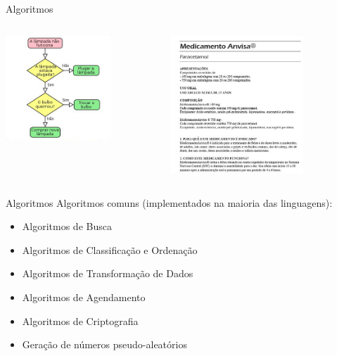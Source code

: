 \documentclass{beamer}
\begin{document}
\begin{frame}{Algoritmos}
	\label{algoritmos}
\begin{columns}
	\begin{column}{0.5\textwidth}
		\centering
		\includegraphics[width=0.7\textwidth]{imagens/fluxograma-exemplo.jpg}
	\end{column}
	\begin{column}{0.5\textwidth}
		\centering
		\includegraphics[width=0.7\textwidth]{imagens/nao_e_algoritmo.jpg}
	\end{column}
\end{columns}
\end{frame}

\begin{frame}{Algoritmos}
	\label{algoritmos_comuns}
	Algoritmos comuns (implementados na maioria das linguagens):
	\begin{itemize}
		\item Algoritmos de Busca
		\item Algoritmos de Classificação e Ordenação
		\item Algoritmos de Transformação de Dados
		\item Algoritmos de Agendamento
		\item Algoritmos de Criptografia
		\item Geração de números pseudo-aleatórios
	\end{itemize}
\end{frame}
\end{document}

